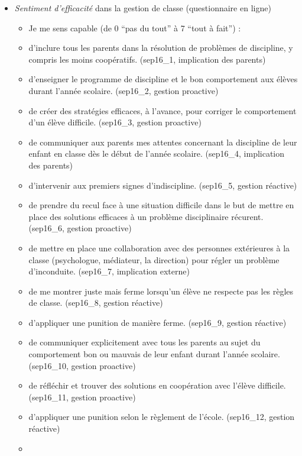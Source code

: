 \documentclass[
]{article}
\begin{document}
\begin{itemize}
\item
  \emph{Sentiment d'efficacité} dans la gestion de classe (questionnaire en ligne)

  \begin{itemize}
  \item
    Je me sens capable (de 0 ``pas du tout'' à 7 ``tout à fait'') :
  \item
    d'inclure tous les parents dans la résolution de problèmes de discipline, y compris les moins coopératifs. (sep16\_1, implication des parents)
  \item
    d'enseigner le programme de discipline et le bon comportement aux élèves durant l'année scolaire. (sep16\_2, gestion proactive)
  \item
    de créer des stratégies efficaces, à l'avance, pour corriger le comportement d'un élève difficile. (sep16\_3, gestion proactive)
  \item
    de communiquer aux parents mes attentes concernant la discipline de leur enfant en classe dès le début de l'année scolaire. (sep16\_4, implication des parents)
  \item
    d'intervenir aux premiers signes d'indiscipline. (sep16\_5, gestion réactive)
  \item
    de prendre du recul face à une situation difficile dans le but de mettre en place des solutions efficaces à un problème disciplinaire récurent. (sep16\_6, gestion proactive)
  \item
    de mettre en place une collaboration avec des personnes extérieures à la classe (psychologue, médiateur, la direction) pour régler un problème d'inconduite. (sep16\_7, implication externe)
  \item
    de me montrer juste mais ferme lorsqu'un élève ne respecte pas les règles de classe. (sep16\_8, gestion réactive)
  \item
    d'appliquer une punition de manière ferme. (sep16\_9, gestion réactive)
  \item
    de communiquer explicitement avec tous les parents au sujet du comportement bon ou mauvais de leur enfant durant l'année scolaire. (sep16\_10, gestion proactive)
  \item
    de réfléchir et trouver des solutions en coopération avec l'élève difficile. (sep16\_11, gestion proactive)
  \item
    d'appliquer une punition selon le règlement de l'école. (sep16\_12, gestion réactive)
  \item

\end{itemize}
\end{itemize}
\end{document}
